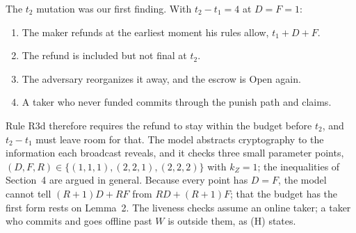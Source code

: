 \documentclass[10pt,letterpaper]{article}
\theoremstyle{plain}
\theoremstyle{definition}
\newcommand{\st}[1]{\textsf{#1}}
\begin{document}
The $t_2$ mutation was our first finding. With $t_2 - t_1 = 4$ at $D=F=1$:
\begin{enumerate}\setlength\itemsep{0.05em}
\item The maker refunds at the earliest moment his rules allow, $t_1 + D + F$.
\item The refund is included but not final at $t_2$.
\item The adversary reorganizes it away, and the escrow is \st{Open} again.
\item A taker who never funded commits through the punish path and claims.
\end{enumerate}
Rule R3d therefore requires the refund to stay within the budget before $t_2$, and $t_2 - t_1$ must
leave room for that. The model abstracts cryptography to the information each broadcast reveals, and it checks three small
parameter points, $(D,F,R) \in \{(1,1,1), (2,2,1), (2,2,2)\}$ with $k_Z=1$; the inequalities of Section~4 are
argued in general. Because every point has $D=F$, the model cannot tell $(R+1)D+RF$ from
$RD+(R+1)F$; that the budget has the first form rests on Lemma~2. The liveness checks assume an online taker; a taker who commits and goes
offline past $W$ is outside them, as (H) states.
\end{document}
